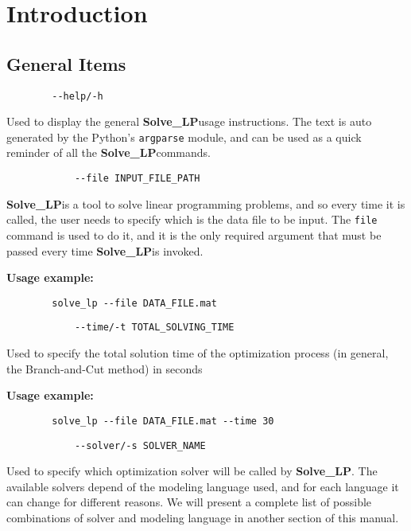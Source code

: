 \documentclass[12pt,hidelinks]{article}
\newcommand{\SolveLP}{\textbf{Solve\_LP}}
\begin{document}
\section{Introduction}
\vspace{10.5cm}
	\subsection{General Items}
	{\color{mordantred19}
	\begin{verbatim}
		--help/-h
	\end{verbatim}
	} Used to display the general \SolveLP usage instructions. The text is auto generated by the Python's \texttt{argparse} module, and can be used as a quick reminder of all the \SolveLP commands.

	{\color{mordantred19}
		\begin{verbatim}
			--file INPUT_FILE_PATH
		\end{verbatim}
	} \SolveLP is a tool to solve linear programming problems, and so every time it is called, the user needs to specify which is the data file to be input. The \texttt{file} command is used to do it, and it is the only required argument that must be passed every time \SolveLP is invoked.

	\textbf{Usage example:} 
	\begin{verbatim}
		solve_lp --file DATA_FILE.mat
	\end{verbatim}

	{\color{mordantred19}
		\begin{verbatim}
			--time/-t TOTAL_SOLVING_TIME
		\end{verbatim}
	} Used to specify the total solution time of the optimization process (in general, the Branch-and-Cut method) in seconds
	
	\textbf{Usage example:} 
	\begin{verbatim}
		solve_lp --file DATA_FILE.mat --time 30
	\end{verbatim}

	{\color{mordantred19}
		\begin{verbatim}
			--solver/-s SOLVER_NAME
		\end{verbatim}
	} Used to specify which optimization solver will be called by \SolveLP. The available solvers depend of the modeling language used, and for each language it can change for different reasons. We will present a complete list of possible combinations of solver and modeling language in another section of this manual.
	
\end{document}
